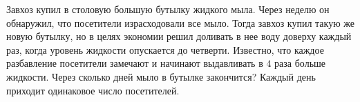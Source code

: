 Завхоз купил в столовую большую бутылку жидкого мыла. Через неделю он обнаружил, что посетители израсходовали все мыло. Тогда завхоз купил такую же новую бутылку, но в целях экономии решил доливать в нее воду доверху каждый раз, когда уровень жидкости опускается до четверти. Известно, что каждое разбавление посетители замечают и начинают выдавливать в $4$ раза больше жидкости. Через сколько дней мыло в бутылке закончится?  Каждый день приходит одинаковое число посетителей.